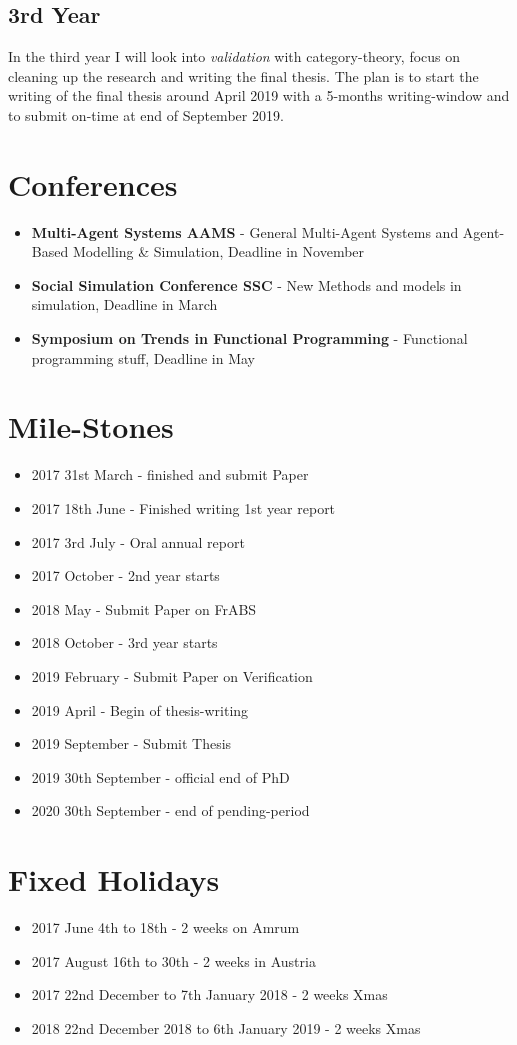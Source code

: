 \subsection{3rd Year}
In the third year I will look into \textit{validation} with category-theory, focus on cleaning up the research and writing the final thesis. The plan is to start the writing of the final thesis around April 2019 with a 5-months writing-window and to submit on-time at end of September 2019.

\section{Conferences}
\begin{itemize}
	\item \textbf{Multi-Agent Systems AAMS} - General Multi-Agent Systems and Agent-Based Modelling \& Simulation, Deadline in November
	\item \textbf{Social Simulation Conference SSC} - New Methods and models in simulation, Deadline in March
	\item \textbf{Symposium on Trends in Functional Programming} - Functional programming stuff, Deadline in May
\end{itemize}

\section{Mile-Stones}
\begin{itemize}
	\item 2017 31st March - finished and submit Paper 
	\item 2017 18th June - Finished writing 1st year report 
	\item 2017 3rd July - Oral annual report
	\item 2017 October - 2nd year starts
	\item 2018 May - Submit Paper on FrABS
	\item 2018 October - 3rd year starts
	\item 2019 February - Submit Paper on Verification
	\item 2019 April - Begin of thesis-writing
	\item 2019 September - Submit Thesis
	\item 2019 30th September - official end of PhD
	\item 2020 30th September - end of pending-period
\end{itemize}

\section{Fixed Holidays}
\begin{itemize}
	\item 2017 June 4th to 18th - 2 weeks on Amrum 
	\item 2017 August 16th to 30th - 2 weeks in Austria
	\item 2017 22nd December to 7th January 2018 - 2 weeks Xmas
	\item 2018 22nd December 2018 to 6th January 2019 - 2 weeks Xmas
\end{itemize}